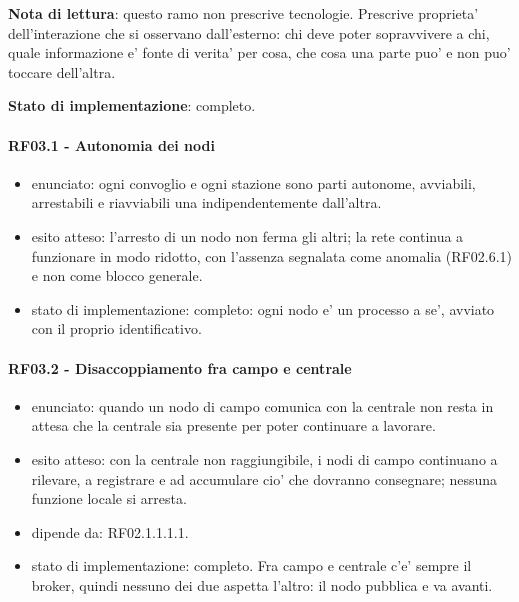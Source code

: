 \documentclass[11pt]{article}
\begin{document}
\textbf{Nota di lettura}: questo ramo non prescrive tecnologie. Prescrive proprieta' dell'interazione che si
osservano dall'esterno: chi deve poter sopravvivere a chi, quale informazione e' fonte di verita' per
cosa, che cosa una parte puo' e non puo' toccare dell'altra.

\textbf{Stato di implementazione}: completo.
\paragraph{RF03.1 - Autonomia dei nodi}
\label{sec:org8c65c28}
\begin{itemize}
\item enunciato: ogni convoglio e ogni stazione sono parti autonome, avviabili, arrestabili e riavviabili
una indipendentemente dall'altra.
\item esito atteso: l'arresto di un nodo non ferma gli altri; la rete continua a funzionare in modo
ridotto, con l'assenza segnalata come anomalia (RF02.6.1) e non come blocco generale.
\item stato di implementazione: completo: ogni nodo e' un processo a se', avviato con il proprio
identificativo.
\end{itemize}
\paragraph{RF03.2 - Disaccoppiamento fra campo e centrale}
\label{sec:org26796b9}
\begin{itemize}
\item enunciato: quando un nodo di campo comunica con la centrale non resta in attesa che la centrale sia
presente per poter continuare a lavorare.
\item esito atteso: con la centrale non raggiungibile, i nodi di campo continuano a rilevare, a
registrare e ad accumulare cio' che dovranno consegnare; nessuna funzione locale si arresta.
\item dipende da: RF02.1.1.1.1.
\item stato di implementazione: completo. Fra campo e centrale c'e' sempre il broker, quindi nessuno dei
due aspetta l'altro: il nodo pubblica e va avanti.
\end{itemize}
\end{document}
